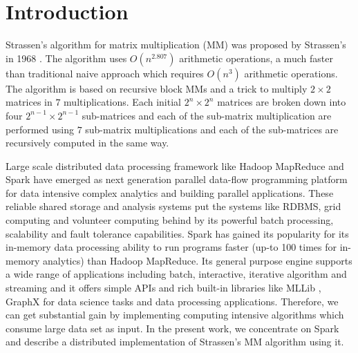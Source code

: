 
\section{Introduction}
Strassen's algorithm for matrix multiplication (MM) was proposed by Strassen's in 1968 \cite{strassen1969gaussian}. The algorithm uses $O(n^{2.807})$ arithmetic operations, a much faster than traditional naive approach which requires $O(n^{3})$ arithmetic operations. The algorithm is based on recursive block MMs and a trick to multiply $2\times 2$ matrices in $7$ multiplications. Each initial $2^{n}\times 2^{n}$ matrices are broken down into four $2^{n-1}\times 2^{n-1}$ sub-matrices and each of the sub-matrix multiplication are performed using $7$ sub-matrix multiplications and each of the sub-matrices are recursively computed in the same way.

Large scale distributed data processing framework like Hadoop MapReduce \cite{hadoop} and Spark \cite{spark} have emerged as next generation parallel data-flow programming platform for data intensive complex analytics and building parallel applications. These reliable shared storage and analysis systems put the systems like RDBMS, grid computing and volunteer computing behind by its powerful batch processing, scalability and fault tolerance capabilities. Spark has gained its popularity for its in-memory data processing ability to run programs faster (up-to 100 times for in-memory analytics) than Hadoop MapReduce. Its general purpose engine supports a wide range of applications including batch, interactive, iterative algorithm and streaming and it offers simple APIs and rich built-in libraries like MLLib \cite{meng2016mllib}, GraphX \cite{xin2013graphx} for data science tasks and data processing applications. Therefore, we can get substantial gain by implementing computing intensive algorithms which consume large data set as input. In the present work, we concentrate on Spark and describe a distributed implementation of Strassen's MM algorithm using it.

